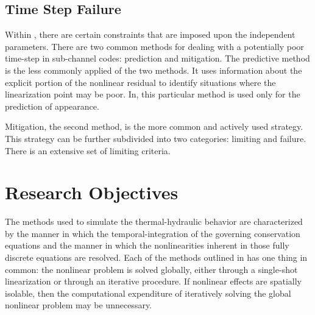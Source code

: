 
\subsection{Time Step Failure}
\label{subsect:time_step_failure}

Within \cobra{}, there are certain constraints that are imposed upon the independent parameters.
There are two common methods for dealing with a potentially poor time-step in sub-channel codes: prediction and mitigation.
The predictive method is the less commonly applied of the two methods.
It uses information about the explicit portion of the nonlinear residual to identify situations where the linearization point may be poor.
In, this particular method is used only for the prediction of appearance.

Mitigation, the second method, is the more common and actively used strategy.
This strategy can be further subdivided into two categories: limiting and failure.
There is an extensive set of limiting criteria.



\section{Research Objectives}
The methods used to simulate the thermal-hydraulic behavior are characterized by the manner in which the temporal-integration of the governing conservation equations and the manner in which the nonlinearities inherent in those fully discrete equations are resolved.
Each of the methods outlined in  has one thing in common: the nonlinear problem is solved globally, either through a single-shot linearization or through an iterative procedure.
If nonlinear effects are spatially isolable, then the computational expenditure of iteratively solving the global nonlinear problem may be unnecessary.

